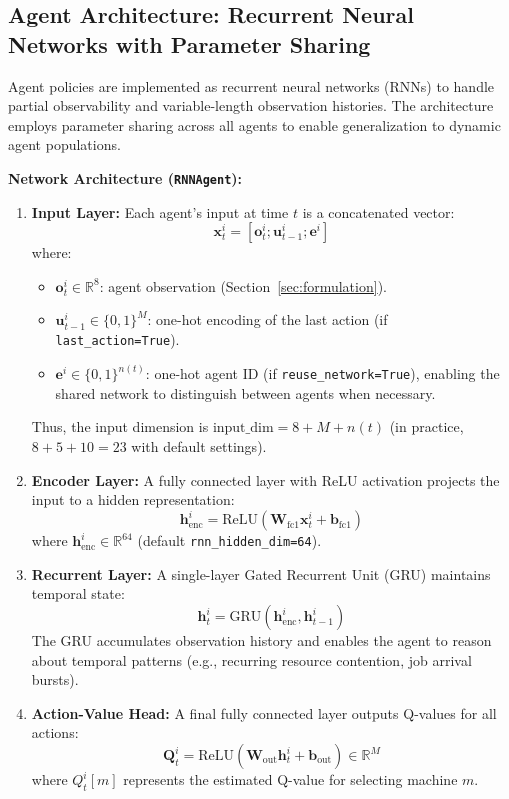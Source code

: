 \subsection{Agent Architecture: Recurrent Neural Networks with Parameter Sharing}
\label{sec:agent_arch}

Agent policies are implemented as recurrent neural networks (RNNs) to handle partial observability and variable-length observation histories. The architecture employs parameter sharing across all agents to enable generalization to dynamic agent populations.

\textbf{Network Architecture (\texttt{RNNAgent}):}

\begin{enumerate}
\item \textbf{Input Layer:} Each agent's input at time \(t\) is a concatenated vector:
\[
\mathbf{x}_t^i = [\mathbf{o}_t^i; \mathbf{u}_{t-1}^i; \mathbf{e}^i]
\]
where:
\begin{itemize}
    \item \(\mathbf{o}_t^i \in \mathbb{R}^8\): agent observation (Section~\ref{sec:formulation}).
    \item \(\mathbf{u}_{t-1}^i \in \{0,1\}^M\): one-hot encoding of the last action (if \texttt{last\_action=True}).
    \item \(\mathbf{e}^i \in \{0,1\}^{n(t)}\): one-hot agent ID (if \texttt{reuse\_network=True}), enabling the shared network to distinguish between agents when necessary.
\end{itemize}
Thus, the input dimension is \(\text{input\_dim} = 8 + M + n(t)\) (in practice, \(8 + 5 + 10 = 23\) with default settings).

\item \textbf{Encoder Layer:} A fully connected layer with ReLU activation projects the input to a hidden representation:
\[
\mathbf{h}_{\text{enc}}^i = \text{ReLU}(\mathbf{W}_{\text{fc1}} \mathbf{x}_t^i + \mathbf{b}_{\text{fc1}})
\]
where \(\mathbf{h}_{\text{enc}}^i \in \mathbb{R}^{64}\) (default \texttt{rnn\_hidden\_dim=64}).

\item \textbf{Recurrent Layer:} A single-layer Gated Recurrent Unit (GRU) maintains temporal state:
\[
\mathbf{h}_t^i = \text{GRU}(\mathbf{h}_{\text{enc}}^i, \mathbf{h}_{t-1}^i)
\]
The GRU accumulates observation history and enables the agent to reason about temporal patterns (e.g., recurring resource contention, job arrival bursts).

\item \textbf{Action-Value Head:} A final fully connected layer outputs Q-values for all actions:
\[
\mathbf{Q}_t^i = \text{ReLU}(\mathbf{W}_{\text{out}} \mathbf{h}_t^i + \mathbf{b}_{\text{out}}) \in \mathbb{R}^M
\]
where \(Q_t^i[m]\) represents the estimated Q-value for selecting machine \(m\).
\end{enumerate}

